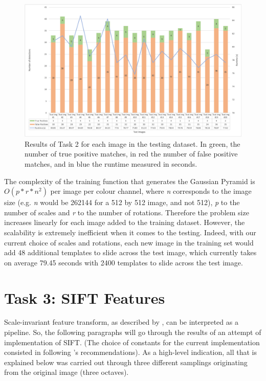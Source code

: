 \documentclass[a4paper,11pt,twocolumn]{article}
\begin{document}
\begin{figure}[!htbp]
\centering
\includegraphics[scale=0.25]{figures/evaluation.png}
\caption{Results of Task 2 for each image in the testing dataset. In green, the number of true positive matches, in red the number of false positive matches, and in blue the runtime measured in seconds.}
\label{fig:template-matching-results} 
\end{figure}

The complexity of the training function that generates the Gaussian Pyramid is $O(p*r*n^2)$ per image per colour channel, where \textit{n} corresponds to the image size (e.g. \textit{n} would be 262144 for a 512 by 512 image, and not 512), \textit{p} to the number of scales and \textit{r} to the number of rotations. Therefore the problem size increases linearly for each image added to the training dataset. However, the scalability is extremely inefficient when it comes to the testing. Indeed, with our current choice of scales and rotations, each new image in the training set would add 48 additional templates to slide across the test image, which currently takes on average 79.45 seconds with 2400 templates to slide across the test image.


\section{Task 3: SIFT Features}
Scale-invariant feature transform, as described by \citet{lowe2004distinctive}, can be interpreted as a pipeline. So, the following paragraphs will go through the results of an attempt of implementation of SIFT. (The choice of constants for the current implementation consisted in following \citet{lowe2004distinctive}'s recommendations). As a high-level indication, all that is explained below was carried out through three different samplings originating from the original image (three octaves).
\end{document}
